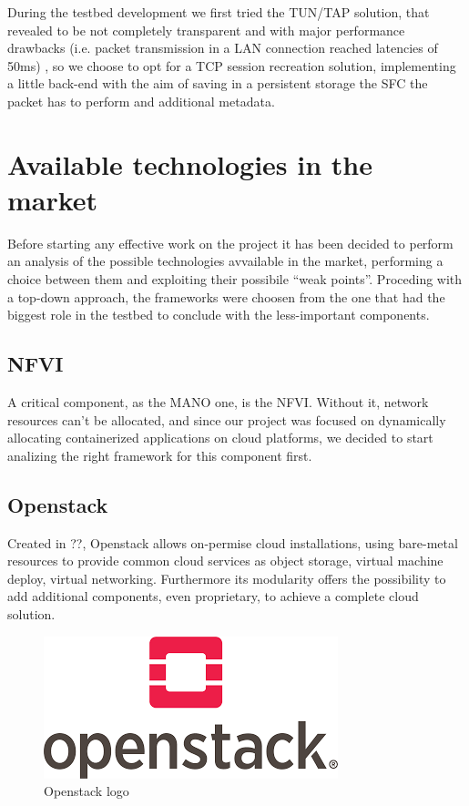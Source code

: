 \documentclass[10pt]{book}
\begin{document}
During the testbed development we first tried the TUN/TAP solution, that
revealed to be not completely transparent and with major performance drawbacks
(i.e. packet transmission in a LAN connection reached latencies of 50ms)
, so we choose to opt for a TCP session recreation solution,
implementing a little back-end with the aim of saving in a persistent storage
the SFC the packet has to perform and additional metadata.

\section{Available technologies in the market}

Before starting any effective work on the project it has been decided to 
perform an analysis of the possible technologies avvailable in the market, 
performing a choice between them and exploiting their possibile ``weak 
points''. Proceding with a top-down approach, the frameworks were choosen from 
the one that had the biggest role in the testbed to conclude with the 
less-important components.

\subsection{NFVI}

A critical component, as the MANO one, is the NFVI. Without it, network 
resources can't be allocated, and since our project was focused on dynamically 
allocating containerized applications on cloud platforms, we decided to start 
analizing the right framework for this component first.

\subsection{Openstack}
\label{chap:prjan:sec:openstack}
Created in ??, Openstack allows
on-permise cloud installations, using bare-metal resources to provide common
cloud services as object storage, virtual machine deploy, virtual networking.
Furthermore its modularity offers the possibility to add additional components,
even proprietary, to achieve a complete cloud solution.
\begin{figure}[t]
 \centering \includegraphics[scale=0.58]{openstack_logo}
 \caption{Openstack logo}
 \label{chap:prjan:img:openstack_logo}
\end{figure}
\end{document}
